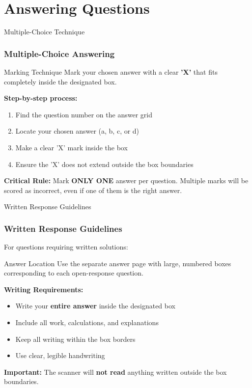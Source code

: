 \documentclass{beamer}
\begin{document}
\section{Answering Questions}

\begin{frame}{Multiple-Choice Technique}
\frametitle{Multiple-Choice Answering}
\begin{block}{Marking Technique}
Mark your chosen answer with a clear \textbf{'X'} that fits completely inside the designated box.
\end{block}

\textbf{Step-by-step process:}
\begin{enumerate}
\item Find the question number on the answer grid
\item Locate your chosen answer (a, b, c, or d)
\item Make a clear 'X' mark inside the box
\item Ensure the 'X' does not extend outside the box boundaries
\end{enumerate}

\textbf{Critical Rule:} Mark \textbf{ONLY ONE} answer per question. Multiple marks will be scored as incorrect, even if one of them is the right answer.
\end{frame}

\begin{frame}{Written Response Guidelines}
\frametitle{Written Response Guidelines}
For questions requiring written solutions:

\begin{block}{Answer Location}
Use the separate answer page with large, numbered boxes corresponding to each open-response question.
\end{block}

\textbf{Writing Requirements:}
\begin{itemize}
\item Write your \textbf{entire answer} inside the designated box
\item Include all work, calculations, and explanations
\item Keep all writing within the box borders
\item Use clear, legible handwriting
\end{itemize}

\textbf{Important:} The scanner will \textbf{not read} anything written outside the box boundaries.

\end{frame}
\end{document}
